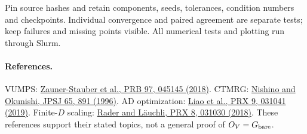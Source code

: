 \documentclass[11pt]{article}
\begin{document}
Pin source hashes and retain components, seeds, tolerances, condition numbers
and checkpoints. Individual convergence and paired agreement are separate
tests; keep failures and missing points visible. All numerical tests and
plotting run through Slurm.

\paragraph{References.}
VUMPS: \href{https://arxiv.org/abs/1701.07035}{Zauner-Stauber et al., PRB 97, 045145 (2018)}.
CTMRG: \href{https://arxiv.org/abs/cond-mat/9507087}{Nishino and Okunishi, JPSJ 65, 891 (1996)}.
AD optimization: \href{https://arxiv.org/abs/1903.09650}{Liao et al., PRX 9, 031041 (2019)}.
Finite-$D$ scaling: \href{https://arxiv.org/abs/1803.08566}{Rader and L\"auchli, PRX 8, 031030 (2018)}.
These references support their stated topics, not a general proof of $O_V=G_{\rm bare}$.
\end{document}
